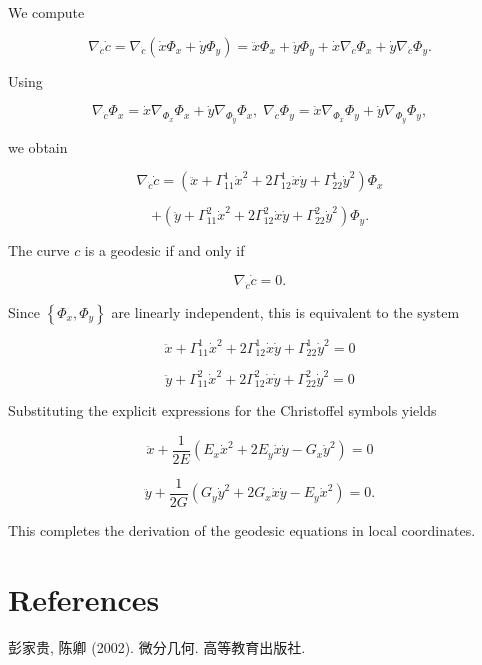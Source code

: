 \documentclass[10pt]{article}
\begin{document}
We compute

\[
{\nabla }_{\dot{c}}\dot{c} = {\nabla }_{\dot{c}}\left( {\dot{x}{\Phi }_{x} + \dot{y}{\Phi }_{y}}\right)  = \ddot{x}{\Phi }_{x} + \ddot{y}{\Phi }_{y} + \dot{x}{\nabla }_{\dot{c}}{\Phi }_{x} + \dot{y}{\nabla }_{\dot{c}}{\Phi }_{y}.
\]

Using

\[
{\nabla }_{\dot{c}}{\Phi }_{x} = \dot{x}{\nabla }_{{\Phi }_{x}}{\Phi }_{x} + \dot{y}{\nabla }_{{\Phi }_{y}}{\Phi }_{x},\;{\nabla }_{\dot{c}}{\Phi }_{y} = \dot{x}{\nabla }_{{\Phi }_{x}}{\Phi }_{y} + \dot{y}{\nabla }_{{\Phi }_{y}}{\Phi }_{y},
\]

we obtain

\[
{\nabla }_{\dot{c}}\dot{c} = \left( {\ddot{x} + {\Gamma }_{11}^{1}{\dot{x}}^{2} + 2{\Gamma }_{12}^{1}\dot{x}\dot{y} + {\Gamma }_{22}^{1}{\dot{y}}^{2}}\right) {\Phi }_{x}
\]

\[
+ \left( {\ddot{y} + {\Gamma }_{11}^{2}{\dot{x}}^{2} + 2{\Gamma }_{12}^{2}\dot{x}\dot{y} + {\Gamma }_{22}^{2}{\dot{y}}^{2}}\right) {\Phi }_{y}.
\]

The curve \(c\) is a geodesic if and only if

\[
{\nabla }_{\dot{c}}\dot{c} = 0.
\]

Since \(\left\{  {{\Phi }_{x},{\Phi }_{y}}\right\}\) are linearly independent, this is equivalent to the system

\[
\ddot{x} + {\Gamma }_{11}^{1}{\dot{x}}^{2} + 2{\Gamma }_{12}^{1}\dot{x}\dot{y} + {\Gamma }_{22}^{1}{\dot{y}}^{2} = 0
\]

\[
\ddot{y} + {\Gamma }_{11}^{2}{\dot{x}}^{2} + 2{\Gamma }_{12}^{2}\dot{x}\dot{y} + {\Gamma }_{22}^{2}{\dot{y}}^{2} = 0
\]

Substituting the explicit expressions for the Christoffel symbols yields

\[
\ddot{x} + \frac{1}{2E}\left( {{E}_{x}{\dot{x}}^{2} + 2{E}_{y}\dot{x}\dot{y} - {G}_{x}{\dot{y}}^{2}}\right)  = 0
\]

\[
\ddot{y} + \frac{1}{2G}\left( {{G}_{y}{\dot{y}}^{2} + 2{G}_{x}\dot{x}\dot{y} - {E}_{y}{\dot{x}}^{2}}\right)  = 0.
\]

This completes the derivation of the geodesic equations in local coordinates.

\section*{References}

彭家贵, 陈卿 (2002). 微分几何. 高等教育出版社.
\end{document}
